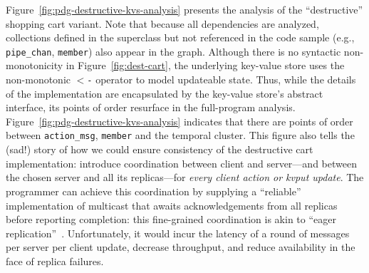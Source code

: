 Figure~\ref{fig:pdg-destructive-kvs-analysis} presents the analysis of the 
``destructive'' shopping cart variant.  Note that
because all dependencies are analyzed, collections defined in the superclass
but not referenced in the code sample
(e.g., \texttt{pipe\_chan}, \texttt{member}) also appear in the graph.
Although there is no syntactic
non-monotonicity in 
Figure~\ref{fig:dest-cart}, the underlying key-value store
uses the non-monotonic \texttt{$<$-} operator to model updateable state.
Thus, while the details of the implementation are encapsulated by the key-value
store's abstract interface, its points of order resurface in the full-program analysis.
Figure~\ref{fig:pdg-destructive-kvs-analysis}
indicates that there are
points of order between \texttt{action\_msg}, \texttt{member} and the temporal cluster.
This figure also tells the (sad!) story of how we could ensure consistency of
the destructive cart implementation: introduce coordination between client and
server---and between the chosen server and all its replicas---for {\em every
  client action or kvput update}.  The programmer can achieve this
coordination by supplying a ``reliable'' implementation of multicast that awaits
acknowledgements from all replicas before reporting completion: this
fine-grained coordination is akin to ``eager replication''~\cite{dangers}.
Unfortunately, it would incur the latency of a round of messages per server per
client update, decrease throughput, and reduce availability in the face of
replica failures.

